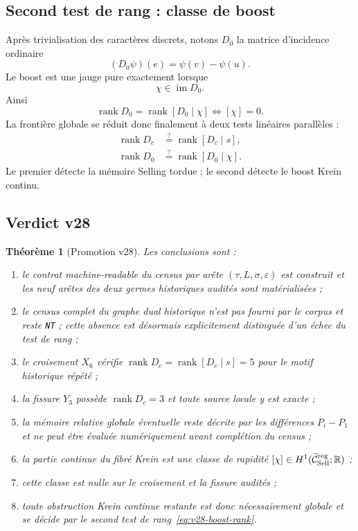 \documentclass[11pt,a4paper]{article}
\newtheorem{theorem}{Théorème}[section]
\newcommand{\rank}{\operatorname{rank}}
\newcommand{\certNT}{\texttt{NT}}
\begin{document}
\subsection{Second test de rang : classe de boost}

Après trivialisation des caractères discrets, notons $D_0$ la matrice d'incidence ordinaire
\[
 (D_0\psi)(e)=\psi(v)-\psi(u).
\]
Le boost est une jauge pure exactement lorsque
\[
 \chi\in\operatorname{im}D_0.
\]
Ainsi
\begin{equation}\label{eq:v28-boost-rank}
 \boxed{
 \rank D_0
 =
 \rank[D_0\mid\chi]
 \iff
 [\chi]=0.}
\end{equation}
La frontière globale se réduit donc finalement à deux tests linéaires parallèles :
\begin{equation}\label{eq:v28-double-rank}
 \boxed{
 \begin{aligned}
 \rank D_c&\stackrel?=\rank[D_c\mid s],\\
 \rank D_0&\stackrel?=\rank[D_0\mid\chi].
 \end{aligned}}
\end{equation}
Le premier détecte la mémoire Selling tordue ; le second détecte le boost Krein continu.

\subsection{Verdict v28}

\begin{theorem}[Promotion v28]\label{thm:v28-verdict}
Les conclusions sont :
\begin{enumerate}[label=\textup{(\roman*)}]
\item le contrat machine-readable du census par arête $(\tau,L,\sigma,\varepsilon)$ est construit et les neuf arêtes des deux germes historiques audités sont matérialisées ;
\item le census complet du graphe dual historique n'est pas fourni par le corpus et reste \certNT{} ; cette absence est désormais explicitement distinguée d'un échec du test de rang ;
\item le croisement $X_6$ vérifie $\rank D_c=\rank[D_c\mid s]=5$ pour le motif historique répété ;
\item la fissure $Y_3$ possède $\rank D_c=3$ et toute source locale y est exacte ;
\item la mémoire relative globale éventuelle reste décrite par les différences $P_i-P_1$ et ne peut être évaluée numériquement avant complétion du census ;
\item la partie continue du fibré Krein est une classe de rapidité $[\chi]\in H^1(\widetilde{\mathcal C}_{\rm Sell}^{\rm reg};\mathbb R)$ ;
\item cette classe est nulle sur le croisement et la fissure audités ;
\item toute obstruction Krein continue restante est donc nécessairement globale et se décide par le second test de rang~\eqref{eq:v28-boost-rank}.
\end{enumerate}
\end{theorem}
\end{document}
